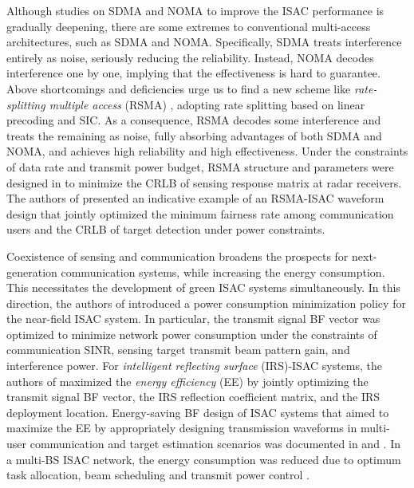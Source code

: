 Although studies on SDMA and NOMA to improve the ISAC performance is gradually deepening, there are some extremes to conventional multi-access architectures, such as SDMA and NOMA. Specifically, SDMA treats interference entirely as noise, seriously reducing the reliability. Instead, NOMA decodes interference one by one, implying that the effectiveness is hard to guarantee. Above shortcomings and deficiencies urge us to find a new scheme like \emph{rate-splitting multiple access} (RSMA)  \cite{ISAC_PLS_14}, adopting rate splitting based on linear precoding and SIC. As a consequence, RSMA decodes some interference and treats the remaining as noise, fully absorbing advantages of both SDMA and NOMA, and achieves high reliability and high effectiveness. Under the constraints of data rate and transmit power budget, RSMA structure and parameters were designed in \cite{ISAC_PLS_48} to minimize the CRLB of sensing response matrix at radar receivers. The authors of \cite{ISAC_PLS_49} presented an indicative example of an RSMA-ISAC waveform design that jointly optimized the minimum fairness rate among communication users and the CRLB of target detection under power constraints.

Coexistence of sensing and communication broadens the prospects for next-generation communication systems, while increasing the energy consumption. This necessitates the development of green ISAC systems simultaneously. In this direction, the authors of \cite{ISAC_PLS_29} introduced a power consumption minimization policy for the near-field ISAC system. In particular, the transmit signal BF vector was optimized to minimize network power consumption under the constraints of communication SINR, sensing target transmit beam pattern gain, and interference power. For \emph{intelligent reflecting surface} (IRS)-ISAC systems, the authors of \cite{ISAC_PLS_25_re,ISAC_PLS_36_re} maximized the \emph{energy efficiency} (EE) by jointly optimizing the transmit signal BF vector, the IRS reflection coefficient matrix, and the IRS deployment location. Energy-saving BF design of ISAC systems that aimed to maximize the EE by appropriately designing transmission waveforms in multi-user communication and target estimation scenarios was documented in \cite{ISAC_PLS_37} and \cite{ISAC_PLS_38}. %
In a multi-BS ISAC network, the energy consumption was reduced due to optimum task allocation, beam scheduling and transmit power control \cite{ISAC_PLS_40}. %

